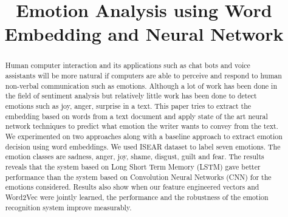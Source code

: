 \documentclass[conference]{IEEEtran}
\numberwithin{equation}{section}
\numberwithin{figure}{section}
\numberwithin{table}{section}
\begin{document}
%
\title{Emotion Analysis using Word Embedding and Neural Network}

\author{
}
\maketitle


\begin{abstract}
Human computer interaction and its applications such as chat bots and voice assistants  will be more natural if computers are able to perceive and respond to human non-verbal communication such as emotions. Although a lot of work has been done in the field of sentiment analysis but relatively little work has been done to detect emotions such as joy, anger, surprise in a text. This paper tries to extract the embedding based on words from a text document and apply state of the art neural network techniques to predict what emotion the writer wants to convey from the text. We experimented on two approaches along with a baseline approach to extract emotion decision using word embeddings. We used ISEAR dataset to label seven emotions. The emotion classes are sadness, anger, joy, shame, disgust, guilt and fear. The results reveals that the system based on Long Short Term Memory (LSTM) gave better performance than the system based on Convolution Neural Networks (CNN) for the emotions considered. Results also show when our feature engineered vectors and Word2Vec were jointly learned, the performance and the robustness of the emotion recognition system improve measurably. 
\end{abstract}
\end{document}
